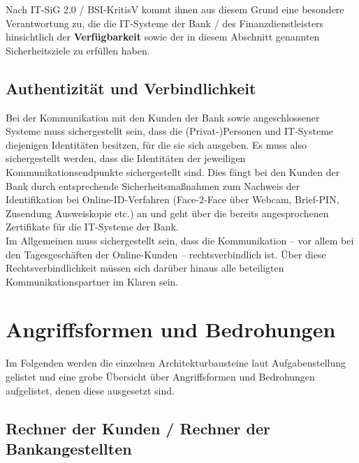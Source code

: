 \noindent
Nach IT-SiG 2.0 / BSI-KritisV kommt ihnen aus diesem Grund eine besondere Verantwortung zu, die die IT-Systeme der Bank / des Finanzdienstleisters hinsichtlich der \textbf{Verfügbarkeit} sowie der in diesem Abschnitt genannten Sicherheitsziele zu erfüllen haben.

\subsection{Authentizität und Verbindlichkeit}
Bei der Kommunikation mit den Kunden der Bank sowie angeschlossener Systeme muss sichergestellt sein, dass die (Privat-)Personen und IT-Systeme diejenigen Identitäten besitzen, für die sie sich ausgeben.
Es muss also sichergestellt werden, dass die Identitäten der jeweiligen Kommunikationsendpunkte sichergestellt sind.
Dies fängt bei den Kunden der Bank durch entsprechende Sicherheitsmaßnahmen zum Nachweis der Identifikation bei Online-ID-Verfahren (Face-2-Face über Webcam, Brief-PIN, Zusendung Ausweiskopie etc.) an und geht über die bereits angesprochenen Zertifikate für die IT-Systeme der Bank.\\
Im Allgemeinen muss sichergestellt sein, dass die Kommunikation – vor allem bei den Tagesgeschäften der Online-Kunden – rechtsverbindlich ist.
Über diese Rechtsverbindlichkeit müssen sich darüber hinaus alle beteiligten Kommunikationspartner im Klaren sein.

\section{Angriffsformen und Bedrohungen}

Im Folgenden werden die einzelnen Architekturbausteine laut Aufgabenstellung gelistet und eine grobe Übersicht über Angriffsformen und Bedrohungen aufgelistet, denen diese ausgesetzt sind.

\subsection{Rechner der Kunden / Rechner der Bankangestellten}

